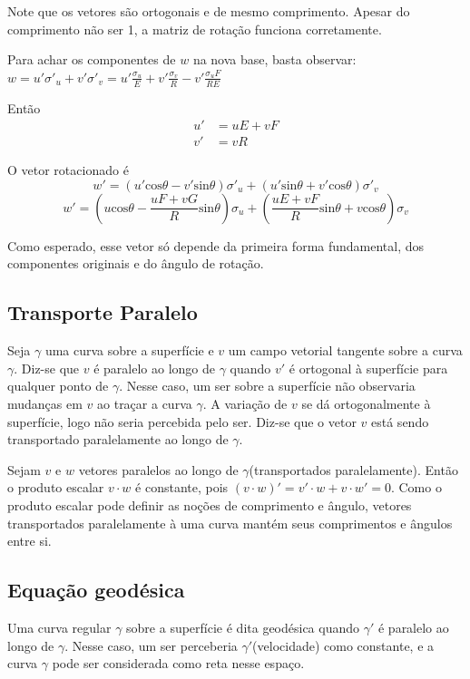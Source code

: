 Note que os vetores são ortogonais e de mesmo comprimento.
Apesar do comprimento não ser 1, a matriz de rotação funciona corretamente.

Para achar os componentes de $w$ na nova base, basta observar:
$w = u'\sigma'_u+v'\sigma'_v = u'\frac{\sigma_u}{E} + v'\frac{\sigma_v}{R}-v'\frac{\sigma_uF}{RE}$

Então
\begin{align*}
    u' &= uE + vF\\
    v' &= vR
\end{align*}

O vetor rotacionado é
\[w' = \left(u'\text{cos}\theta-v'\text{sin}\theta\right)\sigma'_u + \left(u'\text{sin}\theta+v'\text{cos}\theta\right)\sigma'_v\]
\[w' = \left(u\text{cos}\theta-\frac{uF+vG}{R}\text{sin}\theta\right)\sigma_u+\left(\frac{uE+vF}{R}\text{sin}\theta+v\text{cos}\theta\right)\sigma_v\]

Como esperado, esse vetor só depende da primeira forma fundamental,
dos componentes originais e do ângulo de rotação.

\subsection{Transporte Paralelo}
Seja $\gamma$ uma curva sobre a superfície e $v$ um campo vetorial tangente sobre a curva $\gamma$.
Diz-se que $v$ é paralelo ao longo de $\gamma$ quando $v'$ é ortogonal à superfície
para qualquer ponto de $\gamma$.
Nesse caso, um ser sobre a superfície não observaria mudanças em $v$ ao traçar a curva $\gamma$.
A variação de $v$ se dá ortogonalmente à superfície, logo não seria percebida pelo ser.
Diz-se que o vetor $v$ está sendo transportado paralelamente ao longo de $\gamma$.

Sejam $v$ e $w$ vetores paralelos ao longo de $\gamma$(transportados paralelamente).
Então o produto escalar $v \cdot w$ é constante, pois $(v \cdot w)' = v' \cdot w + v \cdot w' = 0$.
Como o produto escalar pode definir as noções de comprimento e ângulo, vetores transportados
paralelamente à uma curva mantém seus comprimentos e ângulos entre si.

\subsection{Equação geodésica}
Uma curva regular $\gamma$ sobre a superfície é dita geodésica quando
$\gamma'$ é paralelo ao longo de $\gamma$.
Nesse caso, um ser perceberia $\gamma'$(velocidade) como constante, e a curva $\gamma$ pode
ser considerada como reta nesse espaço.


